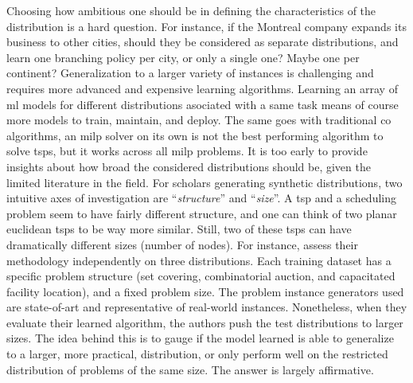 \documentclass[11pt]{article}
\begin{document}
		Choosing how ambitious one should be in defining the characteristics of the distribution is a hard
		question.
		For instance, if the Montreal company expands its business to other cities, should they be
		considered as separate distributions, and learn one branching policy per city, or only a single one?
		Maybe one per continent?
		Generalization to a larger variety of instances is challenging and requires more advanced and
		expensive learning algorithms.
		Learning an array of \gls{ml} models for different distributions asociated with a same task
		means of course more models to train, maintain, and deploy.
		The same goes with traditional \gls{co} algorithms, an \gls{milp} solver on its own is not the best
		performing algorithm to solve \glspl{tsp}, but it works across all \gls{milp} problems.
		It is too early to provide insights about how broad the considered distributions should be,
		given the limited literature in the field.
		For scholars generating synthetic distributions, two intuitive axes of investigation are
		``\textit{structure}'' and ``\textit{size}''.
		A \gls{tsp} and a scheduling problem seem to have fairly different structure, and one can think of
		two planar euclidean \glspl{tsp} to be way more similar.
		Still, two of these \glspl{tsp} can have dramatically different sizes (number of nodes).
		For instance, \cite{GasseExact2019} assess their methodology independently on three distributions.
		Each training dataset has a specific problem structure (set covering, combinatorial auction, and
		capacitated facility location), and a fixed problem size.
		The problem instance generators used are state-of-art and representative of real-world instances.
		Nonetheless, when they evaluate their learned algorithm, the authors push the test distributions to
		larger sizes.
		The idea behind this is to gauge if the model learned is able to generalize to a larger, more
		practical, distribution, or only perform well on the restricted distribution of problems of the same
		size.
		The answer is largely affirmative.
\end{document}
